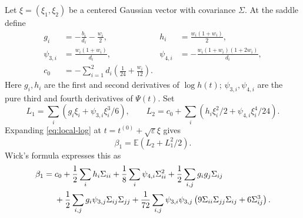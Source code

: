 \documentclass[11pt,reqno]{amsart}
\newcommand{\EE}{\mathbb E}
\theoremstyle{remark}
\numberwithin{equation}{section}
\begin{document}
Let $\xi=(\xi_1,\xi_2)$ be a centered Gaussian vector with covariance $\Sigma$.
At the saddle define
\begin{align}
 g_i&=-\frac{b_i}{d_i}-\frac{w_i}{2},&
 h_i&=\frac{w_i(1+w_i)}2,\label{eq:gh}\\
 \psi_{3,i}&=\frac{w_i(1+w_i)}{d_i},&
 \psi_{4,i}&=-\frac{w_i(1+w_i)(1+2w_i)}{d_i},\label{eq:TV}\\
 c_0&=-\sum_{i=1}^2d_i\left(\frac1{24}+\frac{w_i}{12}\right).
 \label{eq:c0}
\end{align}
Here $g_i,h_i$ are the first and second derivatives of $\log h(t)$;
$\psi_{3,i},\psi_{4,i}$ are the pure third and fourth derivatives of $\Psi(t)$.
Set
\[
 L_1=\sum_i(g_i\xi_i+\psi_{3,i}\xi_i^3/6),\qquad
 L_2=c_0+\sum_i(h_i\xi_i^2/2+\psi_{4,i}\xi_i^4/24).
\]
Expanding \eqref{eq:local-log} at
$t=t^{(0)}+\sqrt{\varepsilon}\xi$ gives
\begin{equation}\label{eq:beta1gauss}
 \beta_1=\EE(L_2+L_1^2/2).
\end{equation}
Wick's formula expresses this as
\begin{align}
 \beta_1={}&c_0+\frac12\sum_i h_i\Sigma_{ii}
       +\frac18\sum_i \psi_{4,i}\Sigma_{ii}^2
       +\frac12\sum_{i,j}g_ig_j\Sigma_{ij}\notag\\
 &+\frac12\sum_{i,j}g_i\psi_{3,j}\Sigma_{ij}\Sigma_{jj}
       +\frac1{72}\sum_{i,j}\psi_{3,i}\psi_{3,j}
          \left(9\Sigma_{ii}\Sigma_{jj}\Sigma_{ij}+6\Sigma_{ij}^3\right).
 \label{eq:beta1contracted}
\end{align}
\end{document}

